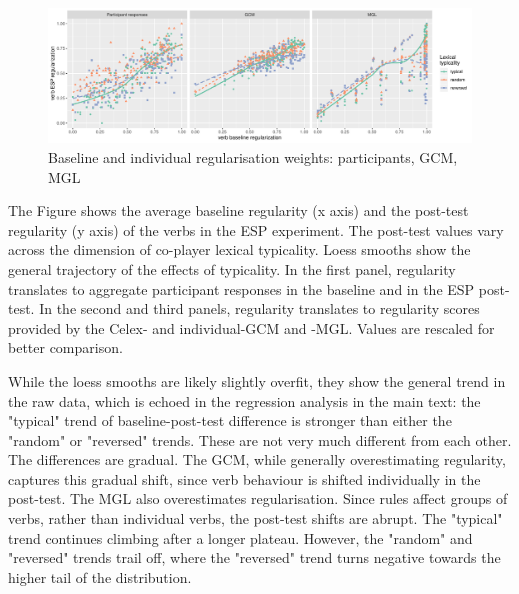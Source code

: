 \documentclass[12pt]{article}
\begin{document}
\begin{figure}
\includegraphics{si-model_figure2}
\caption{Baseline and individual regularisation weights: participants, GCM, MGL}
\label{bigfigure}
\end{figure}

The Figure shows the average baseline regularity (x axis) and the post-test regularity (y axis) of the verbs in the ESP experiment. The post-test values vary across the dimension of co-player lexical typicality. Loess smooths show the general trajectory of the effects of typicality. In the first panel, regularity translates to aggregate participant responses in the baseline and in the ESP post-test. In the second and third panels, regularity translates to regularity scores provided by the {\sc Celex}- and individual-GCM and -MGL. Values are rescaled for better comparison.

While the loess smooths are likely slightly overfit, they show the general trend in the raw data, which is echoed in the regression analysis in the main text: the "typical" trend of baseline-post-test difference is stronger than either the "random" or "reversed" trends. These are not very much different from each other. The differences are gradual. The GCM, while generally overestimating regularity, captures this gradual shift, since verb behaviour is shifted individually in the post-test. The MGL also overestimates regularisation. Since rules affect groups of verbs, rather than individual verbs, the post-test shifts are abrupt. The "typical" trend continues climbing after a longer plateau. However, the "random" and "reversed" trends trail off, where the "reversed" trend turns negative towards the higher tail of the distribution.


\newpage



\end{document}
